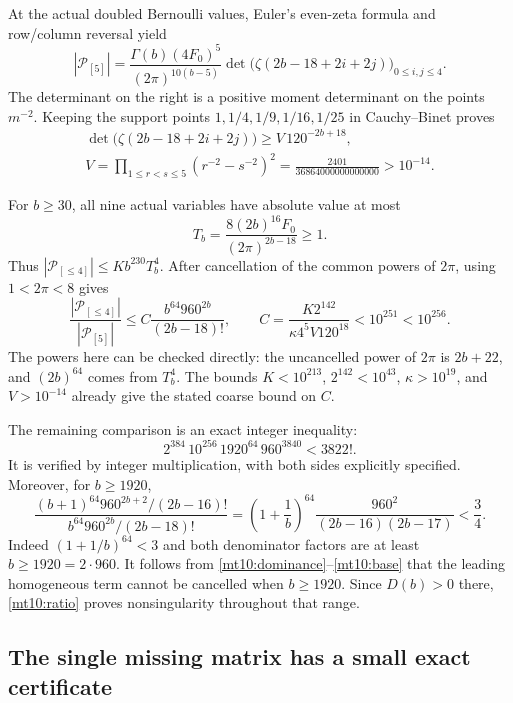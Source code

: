 At the actual doubled Bernoulli values, Euler's even-zeta formula
and row/column reversal yield
\[
 |\mathscr P_{[5]}|
 =\frac{\Gamma(b)(4F_0)^5}{(2\pi)^{10(b-5)}}
       \det\bigl(\zeta(2b-18+2i+2j)\bigr)_{0\le i,j\le4}.
\]
The determinant on the right is a positive moment determinant on
the points $m^{-2}$. Keeping the support points $1,1/4,1/9,1/16,1/25$
in Cauchy--Binet proves
\begin{gather*}
 \det\bigl(\zeta(2b-18+2i+2j)\bigr)\ge V\,120^{-2b+18},\\
 V=\prod_{1\le r<s\le5}(r^{-2}-s^{-2})^2
        =\frac{2401}{36864000000000000}>10^{-14}.
\end{gather*}

For $b\ge30$, all nine actual variables have absolute value at most
\[
       T_b=\frac{8(2b)^{16}F_0}{(2\pi)^{2b-18}}\ge1.
\]
Thus $|\mathscr P_{[\le4]}|\le Kb^{230}T_b^4$.
After cancellation of the common powers of $2\pi$, using
$1<2\pi<8$ gives
\begin{equation}\label{mt10:dominance}
 \frac{|\mathscr P_{[\le4]}|}{|\mathscr P_{[5]}|}
 \le C\frac{b^{64}960^{2b}}{(2b-18)!},\qquad
 C=\frac{K2^{142}}{\kappa4^5V120^{18}}<10^{251}<10^{256}.
\end{equation}
The powers here can be checked directly: the uncancelled power of
$2\pi$ is $2b+22$, and $(2b)^{64}$ comes from $T_b^4$.
The bounds $K<10^{213}$, $2^{142}<10^{43}$, $\kappa>10^{19}$,
and $V>10^{-14}$ already give the stated coarse bound on $C$.

The remaining comparison is an exact integer inequality:
\begin{equation}\label{mt10:base}
       2^{384}\,10^{256}\,1920^{64}\,960^{3840}<3822!.
\end{equation}
It is verified by integer multiplication, with both sides explicitly
specified. Moreover, for $b\ge1920$,
\[
 \frac{(b+1)^{64}960^{2b+2}/(2b-16)!}
      {b^{64}960^{2b}/(2b-18)!}
 =\left(1+\frac1b\right)^{64}
            \frac{960^2}{(2b-16)(2b-17)}<\frac34.
\]
Indeed $(1+1/b)^{64}<3$ and both denominator factors are at least
$b\ge1920=2\cdot960$. It follows from
\eqref{mt10:dominance}--\eqref{mt10:base} that the leading homogeneous
term cannot be cancelled when $b\ge1920$. Since $D(b)>0$ there,
\eqref{mt10:ratio} proves nonsingularity throughout that range.

\subsection{The single missing matrix has a small exact certificate}

